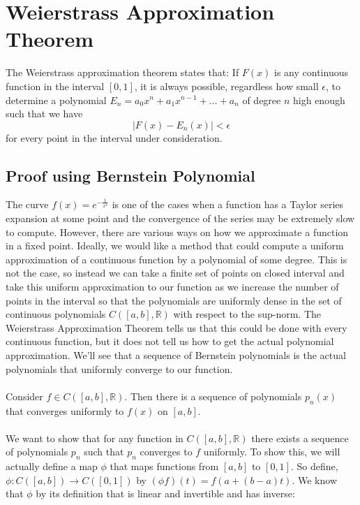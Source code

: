 \documentclass{article}
\begin{document}
\section{Weierstrass Approximation Theorem}\label{sec:wet}
The Weierstrass approximation theorem states that:
\newline
 If $F(x)$ is any continuous function in the interval $[0,1]$, it is always possible, regardless how small $\epsilon$, to determine a polynomial $E_n=a_0x^n+a_1x^{n-1}+\dots+a_n$ of degree $n$ high enough such that we have 
\begin{equation*}
    |F(x)-E_n(x)|<\epsilon
\end{equation*}
for every point in the interval under consideration.\cite{bertrand15}
\subsection{Proof using Bernstein Polynomial}\label{subsec:pfd}
The curve $f(x)=e^{-\frac{1}{x^2}}$ is one of the cases when a function has a Taylor series expansion at some point and the convergence of the series may be extremely slow to compute. However, there are various ways on how we approximate a function in a fixed point. Ideally, we would like a method that could compute a uniform approximation of a continuous function by a polynomial of some degree. This is not the case, so instead we can take a finite set of points on closed interval and take this uniform approximation to our function as we increase the number of points in the interval so that the polynomials are uniformly dense in the set of continuous polynomials $C( [a,b] , \mathbb{R})$ with respect to the sup-norm. The Weierstrass Approximation Theorem tells us that this could be done with every continuous function, but it does not tell us how to get the actual polynomial approximation. We’ll see that a sequence of Bernstein polynomials is the actual polynomials that uniformly converge to our function.\paragraph{}
Consider $f \in C([a,b] ,\mathbb{R})$. Then there is a sequence of polynomials $p_n(x)$ that converges uniformly to $f(x)$ on $[a, b]$.\paragraph{}
We want to show that for any function in $C( [a,b] ,\mathbb{R})$ there exists a sequence of polynomials $p_n$ such that $p_n$ converges to $f$ uniformly. To show this, we will actually define a map $\phi$ that maps functions from $[a,b]$ to $[0,1]$. So define, $\phi:C([a,b])\rightarrow{}C([0,1])$ by $(\phi f)(t)=f(a+(b-a)t)$. We know that $\phi$ by its definition that is linear and invertible and has inverse:
\end{document}
